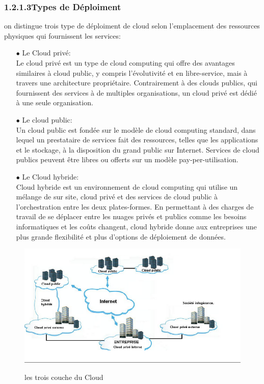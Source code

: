         \subsubsection{1.2.1.3Types de Déploiment}
            on distingue trois type de déploiment de cloud selon l'emplacement des ressources physiques qui fournissent les services:
                \begin{itemize}
                    \item[\quad $\bullet$]Le Cloud privé:\\
                    Le cloud privé est un type de cloud computing qui offre des avantages similaires à cloud public, y compris l'évolutivité et en libre-service, mais à travers une architecture propriétaire. Contrairement à des clouds publics, qui fournissent des services à de multiples organisations, un cloud privé est dédié à une seule organisation.
                    \item[\quad $\bullet$]Le cloud public:\\
                    Un cloud public est fondée sur le modèle de cloud computing standard, dans lequel un prestataire de services fait des ressources, telles que les applications et le stockage, à la disposition du grand public sur Internet. Services de cloud publics peuvent être libres ou offerts sur un modèle pay-per-utilisation.
                    \item[\quad $\bullet$]Le Cloud hybride:\\
                    Cloud hybride est un environnement de cloud computing qui utilise un mélange de sur site, cloud privé et des services de cloud public à l'orchestration entre les deux plates-formes. En permettant à des charges de travail de se déplacer entre les nuages privés et publics comme les besoins informatiques et les coûts changent, cloud hybride donne aux entreprises une plus grande flexibilité et plus d'options de déploiement de données.

                \end{itemize}
                    \begin{figure}[H]
                    \centering
                    \includegraphics[width=12cm]{cloud_prive_public_hybride}\\
                    \caption{les trois couche du Cloud}\label{cloud_prive_public_hybride}
                \end{figure}
